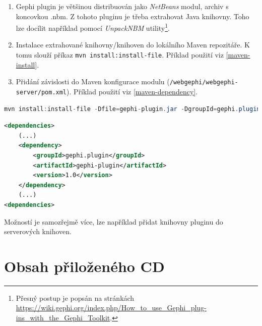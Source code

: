 \documentclass[thesis=M,czech]{FITthesis}[2014/05/6]
\begin{document}
\begin{enumerate}
  \item Gephi plugin je většinou distribuován jako \textit{NetBeans} modul, archiv s koncovkou .nbm. Z tohoto pluginu je třeba extrahovat Java knihovny. 
Toho lze docílit například pomocí \textit{UnpackNBM}
utility\footnote{Přesný postup je popsán na stránkách  \url{https://wiki.gephi.org/index.php/How\_to\_use\_Gephi\_plug-ins\_with\_the\_Gephi\_Toolkit}.}.
  \item Instalace extrahované knihovny/knihoven do lokálního Maven repozitáře. K tomu slouží příkaz \texttt{mvn install:install-file}. Příklad použití viz \ref{maven-install}.
   \item Přidání závislosti do Maven konfigurace modulu (\texttt{/web\-gep\-hi/\-web\-gep\-hi-ser\-ver/\-pom.xml}). Příklad použití viz \ref{maven-dependency}.
\end{enumerate}

\begin{lstlisting}[caption=Instalace knihovny do lokálního Maven repozitáře, label=maven-install, language=java]
mvn install:install-file -Dfile=gephi-plugin.jar -DgroupId=gephi.plugin -DartifactId=gephi-plugin -Dversion=1.0 -Dpackaging=jar
\end{lstlisting} 

\begin{lstlisting}[caption=Přidání závislosti do Maven konfigurace modulu \textit{WebGephi Server}, label=maven-dependency, language=xml]
<dependencies>
	(...)
	<dependency>
		<groupId>gephi.plugin</groupId>
		<artifactId>gephi-plugin</artifactId>
		<version>1.0</version>
	</dependency>
	(...)
<dependencies>
\end{lstlisting}

Možností je samozřejmě více, lze například přidat knihovny pluginu do serverových knihoven.


\chapter{Obsah přiloženého CD}

\begin{figure}
\end{figure}
\end{document}
